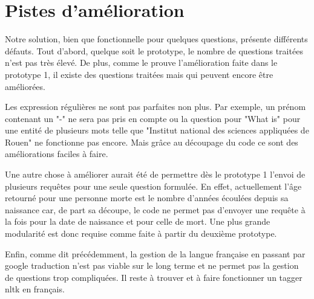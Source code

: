 \documentclass[11pt,a4paper]{article}
\begin{document}
\section*{Pistes d'amélioration}
Notre solution, bien que fonctionnelle pour quelques questions, présente différents défauts. Tout d'abord, quelque soit le prototype, le nombre de questions traitées n'est pas très élevé. 
De plus, comme le prouve l'amélioration faite dans le prototype 1, il existe des questions traitées mais qui peuvent encore être améliorées.\par 
Les expression régulières ne sont pas parfaites non plus. Par exemple, un prénom contenant un "-" ne sera pas pris en compte ou la question pour "What is" pour une entité de plusieurs mots telle que "Institut national des sciences appliquées de Rouen" ne fonctionne pas encore. Mais grâce au découpage du code ce sont des améliorations faciles à faire.\par
Une autre chose à améliorer aurait été de permettre dès le prototype 1 l'envoi de plusieurs requêtes pour une seule question formulée. En effet, actuellement l'âge retourné pour une personne morte est le nombre d'années écoulées depuis sa naissance car, de part sa découpe, le code ne permet pas d'envoyer une requête à la fois pour la date de naissance et pour celle de mort. Une plus grande modularité est donc requise comme faite à partir du deuxième prototype. \par
Enfin, comme dit précédemment, la gestion de la langue française en passant par google traduction n'est pas viable sur le long terme et ne permet pas la gestion de questions trop compliquées. Il reste à trouver et à faire fonctionner un tagger nltk en français.
\end{document}

